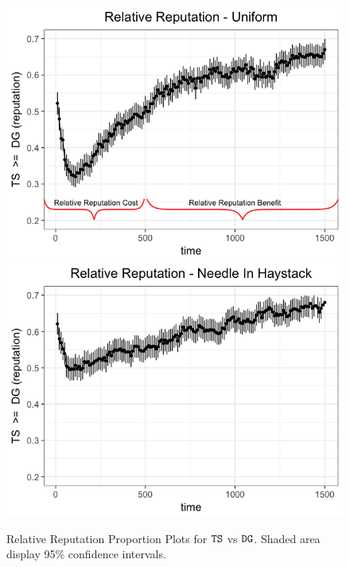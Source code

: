 \documentclass[../competing_bandits.tex]{subfiles}
\begin{document}
\begin{figure}[ht]
\caption{Relative Reputation Proportion Plots for $\mathtt{TS}$ vs $\mathtt{DG}$. Shaded area display 95\% confidence intervals.}
\includegraphics[scale=0.35]{figures/relative_uniform_annotated_plot}
\includegraphics[scale=0.35]{figures/relative_nih_ts_dg.png}
\label{relative_rep_plots}

\end{figure}
\end{document}
